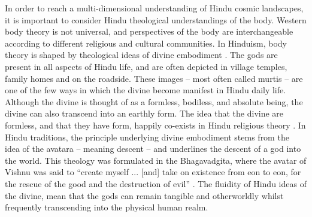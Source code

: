 In order to reach a multi-dimensional understanding of Hindu cosmic landscapes, it is important to consider Hindu theological understandings of the body. Western body theory is not universal, and perspectives of the body are interchangeable according to different religious and cultural communities. In Hinduism, body theory is shaped by theological ideas of divine embodiment \parencite {Beck_1976}. The gods are present in all aspects of Hindu life, and are often depicted in village temples, family homes and on the roadside. These images – most often called murtis – are one of the few ways in which the divine become manifest in Hindu daily life. Although the divine is thought of as a formless, bodiless, and absolute being, the divine can also transcend into an earthly form. The idea that the divine are formless, and that they have form, happily co-exists in Hindu religious theory \parencite[211] {Smith_1989}. In Hindu traditions, the principle underlying divine embodiment stems from the idea of the avatara – meaning descent – and underlines the descent of a god into the world. This theology was formulated in the Bhagavadgita, where the avatar of Vishnu was said to “create myself ... [and] take on existence from eon to eon, for the rescue of the good and the destruction of evil” \parencite[87] {Buitenen_1981}. The fluidity of Hindu ideas of the divine, mean that the gods can remain tangible and otherworldly whilst frequently transcending into the physical human realm.

